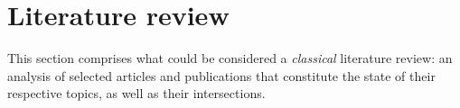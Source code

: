 \section{Literature review}\label{sec:review}

This section comprises what could be considered a \emph{classical} literature
review: an analysis of selected articles and publications that constitute the
state of their respective topics, as well as their intersections.
